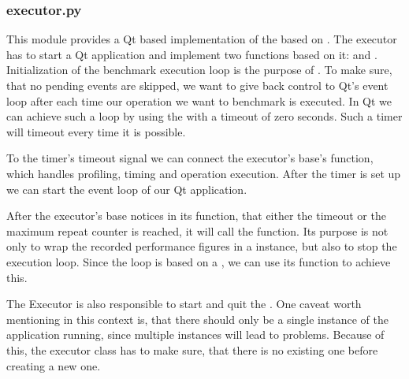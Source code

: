 

\subsubsection*{executor.py}

This module provides a Qt based implementation of the
 based on
. The executor has to start a Qt application
and implement two functions based on it:  and
. Initialization of the benchmark execution loop is the
purpose of . To make sure, that no pending events
are skipped, we want to give back control to Qt's event loop after each time our
operation we want to benchmark is executed. In Qt we can achieve such a loop
by using the  with a timeout of zero seconds.
Such a timer will timeout every time it is possible. 
\cite{QTimer}

To the timer's timeout signal we can connect the executor's base's
 function, which handles profiling, timing
and operation execution. After the timer is set up we can start the event loop
of our Qt application.



After the executor's base notices in its
 function, that either the timeout or
the maximum repeat counter is reached, it will call the
 function. Its purpose is not only to wrap the
recorded performance figures in a  instance,
but also to stop the execution loop. Since the loop is based on a
, we can use its 
function to achieve this.



The Executor is also responsible to start and quit the
. One caveat worth mentioning in this
context is, that there should only be a single instance of the application
running, since multiple  instances will lead to
problems. Because of this, the executor class has to make sure, that there is
no existing one before creating a new one.

